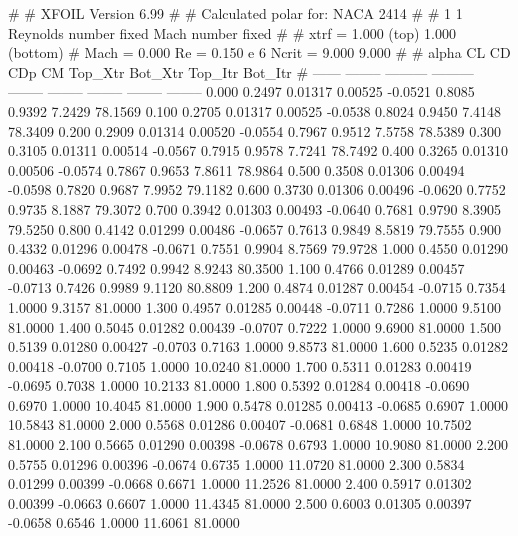#  
#       XFOIL         Version 6.99
#  
# Calculated polar for: NACA 2414                                       
#  
# 1 1 Reynolds number fixed          Mach number fixed         
#  
# xtrf =   1.000 (top)        1.000 (bottom)  
# Mach =   0.000     Re =     0.150 e 6     Ncrit =   9.000  9.000
#  
#   alpha    CL        CD       CDp       CM     Top_Xtr  Bot_Xtr  Top_Itr  Bot_Itr
#  ------ -------- --------- --------- -------- -------- -------- -------- --------
   0.000   0.2497   0.01317   0.00525  -0.0521   0.8085   0.9392   7.2429  78.1569
   0.100   0.2705   0.01317   0.00525  -0.0538   0.8024   0.9450   7.4148  78.3409
   0.200   0.2909   0.01314   0.00520  -0.0554   0.7967   0.9512   7.5758  78.5389
   0.300   0.3105   0.01311   0.00514  -0.0567   0.7915   0.9578   7.7241  78.7492
   0.400   0.3265   0.01310   0.00506  -0.0574   0.7867   0.9653   7.8611  78.9864
   0.500   0.3508   0.01306   0.00494  -0.0598   0.7820   0.9687   7.9952  79.1182
   0.600   0.3730   0.01306   0.00496  -0.0620   0.7752   0.9735   8.1887  79.3072
   0.700   0.3942   0.01303   0.00493  -0.0640   0.7681   0.9790   8.3905  79.5250
   0.800   0.4142   0.01299   0.00486  -0.0657   0.7613   0.9849   8.5819  79.7555
   0.900   0.4332   0.01296   0.00478  -0.0671   0.7551   0.9904   8.7569  79.9728
   1.000   0.4550   0.01290   0.00463  -0.0692   0.7492   0.9942   8.9243  80.3500
   1.100   0.4766   0.01289   0.00457  -0.0713   0.7426   0.9989   9.1120  80.8809
   1.200   0.4874   0.01287   0.00454  -0.0715   0.7354   1.0000   9.3157  81.0000
   1.300   0.4957   0.01285   0.00448  -0.0711   0.7286   1.0000   9.5100  81.0000
   1.400   0.5045   0.01282   0.00439  -0.0707   0.7222   1.0000   9.6900  81.0000
   1.500   0.5139   0.01280   0.00427  -0.0703   0.7163   1.0000   9.8573  81.0000
   1.600   0.5235   0.01282   0.00418  -0.0700   0.7105   1.0000  10.0240  81.0000
   1.700   0.5311   0.01283   0.00419  -0.0695   0.7038   1.0000  10.2133  81.0000
   1.800   0.5392   0.01284   0.00418  -0.0690   0.6970   1.0000  10.4045  81.0000
   1.900   0.5478   0.01285   0.00413  -0.0685   0.6907   1.0000  10.5843  81.0000
   2.000   0.5568   0.01286   0.00407  -0.0681   0.6848   1.0000  10.7502  81.0000
   2.100   0.5665   0.01290   0.00398  -0.0678   0.6793   1.0000  10.9080  81.0000
   2.200   0.5755   0.01296   0.00396  -0.0674   0.6735   1.0000  11.0720  81.0000
   2.300   0.5834   0.01299   0.00399  -0.0668   0.6671   1.0000  11.2526  81.0000
   2.400   0.5917   0.01302   0.00399  -0.0663   0.6607   1.0000  11.4345  81.0000
   2.500   0.6003   0.01305   0.00397  -0.0658   0.6546   1.0000  11.6061  81.0000
